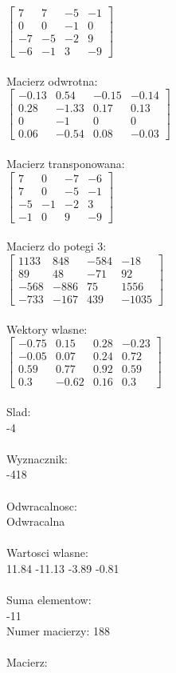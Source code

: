 \documentclass[a4paper,12pt]{article}
\begin{document}
$\begin{bmatrix} 7&7&-5&-1\\0&0&-1&0\\-7&-5&-2&9\\-6&-1&3&-9 \end{bmatrix}$
\\
\\
Macierz odwrotna:\\

$\begin{bmatrix} -0.13&0.54&-0.15&-0.14\\0.28&-1.33&0.17&0.13\\0&-1&0&0\\0.06&-0.54&0.08&-0.03 \end{bmatrix}$
\\
\\
Macierz transponowana:\\

$\begin{bmatrix} 7&0&-7&-6\\7&0&-5&-1\\-5&-1&-2&3\\-1&0&9&-9 \end{bmatrix}$
\\
\\
Macierz do potegi 3:\\

$\begin{bmatrix} 1133&848&-584&-18\\89&48&-71&92\\-568&-886&75&1556\\-733&-167&439&-1035 \end{bmatrix}$
\\
\\
Wektory wlasne:\\

$\begin{bmatrix} -0.75&0.15&0.28&-0.23\\-0.05&0.07&0.24&0.72\\0.59&0.77&0.92&0.59\\0.3&-0.62&0.16&0.3 \end{bmatrix}$
\\
\\
Slad:\\
-4
\\
\\
Wyznacznik:\\
-418
\\
\\
Odwracalnosc:\\
Odwracalna
\\
\\
Wartosci wlasne:\\
11.84 -11.13 -3.89 -0.81
\\
\\
Suma elementow:\\
-11
\\
\newpage
Numer macierzy:
188
\\
\\
Macierz:\\
\end{document}
